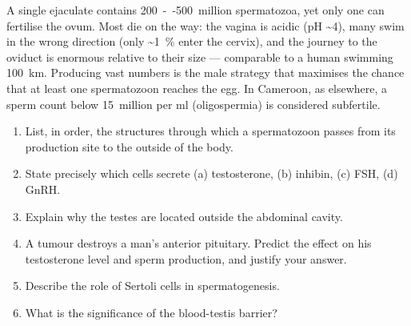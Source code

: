 \documentclass[11pt]{article}
\begin{document}
\begin{savaistu}
A single ejaculate contains \SI{200}{--}\SI{500}{million} spermatozoa, yet only one can fertilise the ovum. Most die on the way: the vagina is acidic (pH \textasciitilde 4), many swim in the wrong direction (only \textasciitilde\SI{1}{\%} enter the cervix), and the journey to the oviduct is enormous relative to their size — comparable to a human swimming \SI{100}{km}. Producing vast numbers is the male strategy that maximises the chance that at least one spermatozoon reaches the egg. In Cameroon, as elsewhere, a sperm count below \SI{15}{million} per ml (oligospermia) is considered subfertile.
\end{savaistu}

\begin{exercice}
\begin{enumerate}
\item List, in order, the structures through which a spermatozoon passes from its production site to the outside of the body.
\item State precisely which cells secrete (a) testosterone, (b) inhibin, (c) FSH, (d) GnRH.
\item Explain why the testes are located outside the abdominal cavity.
\item A tumour destroys a man's anterior pituitary. Predict the effect on his testosterone level and sperm production, and justify your answer.
\item Describe the role of Sertoli cells in spermatogenesis.
\item What is the significance of the blood-testis barrier?
\end{enumerate}
\end{exercice}
\end{document}
